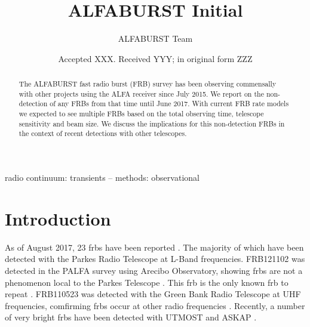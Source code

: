 \documentclass[a4paper,fleqn,usenatbib]{mnras}
\title[ALFABURST Initial]{ALFABURST Initial}
\author[ALFABURST Team]{
ALFABURST Team
}
\date{Accepted XXX. Received YYY; in original form ZZZ}
\begin{document}
\label{firstpage}
\pagerange{\pageref{firstpage}--\pageref{lastpage}}
\maketitle

\begin{abstract}
The ALFABURST fast radio burst (FRB) survey has been observing commensally with
other projects using the ALFA receiver since July 2015. We report on the
non-detection of any FRBs from that time until June 2017. With current FRB rate
models we expected to see multiple FRBs based on the total observing time,
telescope sensitivity and beam size. We discuss the implications for this
non-detection FRBs in the context of recent detections with other telescopes.
\end{abstract}

\begin{keywords}
radio continuum: transients -- methods: observational
\end{keywords}


\section{Introduction}
\label{sec:intro}

As of August 2017, 23 \glspl{frb} have been reported
\citep{2016PASA...33...45P}. The majority of which have been detected with the
Parkes Radio Telescope at L-Band frequencies. FRB121102 was detected in the
PALFA survey using Arecibo Observatory, showing \glspl{frb} are not a phenomenon
local to the Parkes Telescope \citep{2014ApJ...790..101S}. This \gls{frb} is the
only known \gls{frb} to repeat \citep{2016ApJ...833..177S}.  FRB110523 was
detected with the Green Bank Radio Telescope at UHF frequencies, comfirming
\glspl{frb} occur at other radio frequencies \citep{2015Natur.528..523M}.
Recently, a number of very bright \glspl{frb} have been detected with UTMOST
\citep{2017MNRAS.468.3746C} and ASKAP \citep{2017ApJ...841L..12B}.
\end{document}
